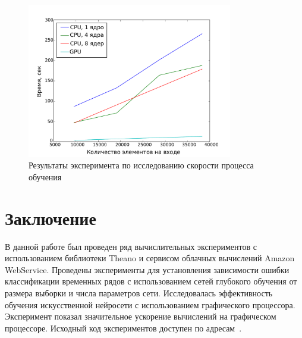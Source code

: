 \documentclass[12pt,notitlepage]{article}
\begin{document}
\begin{figure}[tb!]
 \centering
  \includegraphics[width=0.8\textwidth]{result.pdf}
 \caption{Результаты эксперимента по исследованию скорости процесса обучения}
 \label{fig:speed}
\end{figure}

\section{Заключение}
В данной работе был проведен ряд вычислительных экспериментов с использованием библиотеки Theano и сервисом облачных вычислений Amazon WebService. Проведены эксперименты для установления зависимости ошибки классификации временных рядов с использованием сетей глубокого обучения от размера выборки и числа параметров сети. Исследовалась эффективность обучения искусственной нейросети с использованием графического процессора. Эксперимент показал значительное ускорение вычислений на графическом процессоре. Исходный код экспериментов доступен по адресам~\cite{svn,source_popova}.
\end{document}
